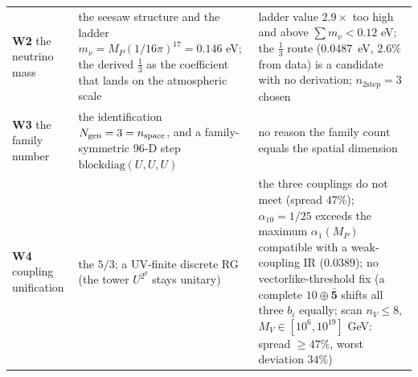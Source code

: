 \documentclass[aps,prd,amsmath,amssymb,superscriptaddress,longbibliography,floatfix,preprint]{revtex4-2}
\begin{document}
{\begin{longtable}{lll}
\arrayrulecolor{black!40}\hline\arrayrulecolor{black}
\parbox[c]{3.6cm}{\vspace{2.5pt}\raggedright {} \textbf{W2} the neutrino mass\vspace{2.5pt}} & \parbox[c]{5.21cm}{\vspace{2.5pt}\raggedright {} the seesaw structure and the ladder $m_\nu = M_P(1/16\pi)^{17} = 0.146$ eV; the derived \mbox{$\tfrac13$} as the coefficient that lands on the atmospheric scale\vspace{2.5pt}} & \parbox[c]{6.29cm}{\vspace{2.5pt}\raggedright {} ladder value \mbox{$2.9\times$} too high and above \mbox{$\sum m_\nu < 0.12$} eV; the \mbox{$\tfrac13$} route (\mbox{$0.0487$ eV}, \mbox{$2.6\%$} from data) is a candidate with no derivation; \mbox{$n_{2\text{step}} = 3$} chosen\vspace{2.5pt}} \\
\hline{}
\parbox[c]{3.6cm}{\vspace{2.5pt}\raggedright {} \textbf{W3} the family number\vspace{2.5pt}} & \parbox[c]{5.21cm}{\vspace{2.5pt}\raggedright {} the identification $N_{\rm gen} = 3 = n_{\rm space}$, and a family-symmetric 96-D step $\mathrm{blockdiag}(U,\allowbreak{}U,\allowbreak{}U)$\vspace{2.5pt}} & \parbox[c]{6.29cm}{\vspace{2.5pt}\raggedright {} no reason the family count equals the spatial dimension\vspace{2.5pt}} \\
\hline{}
\parbox[c]{3.6cm}{\vspace{2.5pt}\raggedright {} \textbf{W4} coupling unification\vspace{2.5pt}} & \parbox[c]{5.21cm}{\vspace{2.5pt}\raggedright {} the \mbox{$5/3$}; a UV-finite discrete RG (the tower \mbox{$U^{2^p}$} stays unitary)\vspace{2.5pt}} & \parbox[c]{6.29cm}{\vspace{2.5pt}\raggedright {} the three couplings do not meet (spread \mbox{$47\%$}); \mbox{$\alpha_{10} = 1/25$} exceeds the maximum \mbox{$\alpha_1(M_P)$} compatible with a weak-coupling IR (\mbox{$0.0389$}); no vectorlike-threshold fix (a complete \mbox{$10\oplus\bar{\mathbf 5}$} shifts all three \mbox{$b_i$} equally; scan \mbox{$n_V \le 8$}, $M_V \in [10^6,\allowbreak{}10^{19}]$ GeV: spread \mbox{$\ge 47\%$}, worst deviation \mbox{$34\%$})\vspace{2.5pt}} \\

\end{longtable}}
\end{document}
